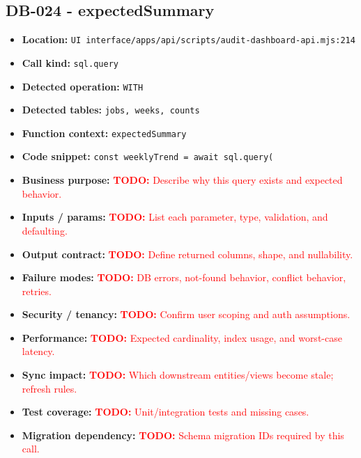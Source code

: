 \documentclass[11pt]{article}
\newcommand{\todoitem}[1]{\textcolor{red}{\textbf{TODO:} #1}}
\begin{document}
\subsection{DB-024 - expectedSummary}
\begin{itemize}[leftmargin=1.5em]
\item \textbf{Location:} \texttt{UI interface/apps/api/scripts/audit-dashboard-api.mjs:214}
\item \textbf{Call kind:} \texttt{sql.query}
\item \textbf{Detected operation:} \texttt{WITH}
\item \textbf{Detected tables:} \texttt{jobs, weeks, counts}
\item \textbf{Function context:} \texttt{expectedSummary}
\item \textbf{Code snippet:} \texttt{const weeklyTrend = await sql.query(}
\item \textbf{Business purpose:} \todoitem{Describe why this query exists and expected behavior.}
\item \textbf{Inputs / params:} \todoitem{List each parameter, type, validation, and defaulting.}
\item \textbf{Output contract:} \todoitem{Define returned columns, shape, and nullability.}
\item \textbf{Failure modes:} \todoitem{DB errors, not-found behavior, conflict behavior, retries.}
\item \textbf{Security / tenancy:} \todoitem{Confirm user scoping and auth assumptions.}
\item \textbf{Performance:} \todoitem{Expected cardinality, index usage, and worst-case latency.}
\item \textbf{Sync impact:} \todoitem{Which downstream entities/views become stale; refresh rules.}
\item \textbf{Test coverage:} \todoitem{Unit/integration tests and missing cases.}
\item \textbf{Migration dependency:} \todoitem{Schema migration IDs required by this call.}
\end{itemize}
\end{document}
